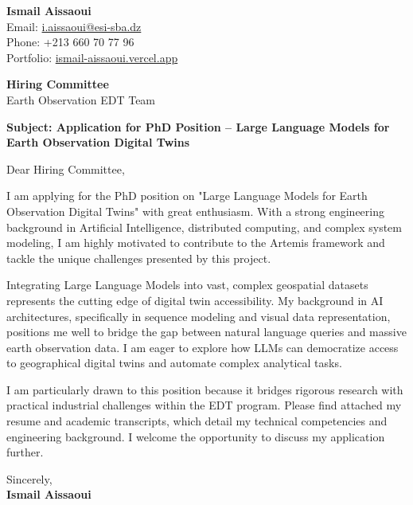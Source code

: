 \documentclass[11pt,a4paper]{article}
\begin{document}
\thispagestyle{empty}

\begin{flushright}
\textbf{Ismail Aissaoui} \\
Email: \href{mailto:i.aissaoui@esi-sba.dz}{i.aissaoui@esi-sba.dz} \\
Phone: +213 660 70 77 96 \\
Portfolio: \href{https://ismail-aissaoui.vercel.app}{ismail-aissaoui.vercel.app}
\end{flushright}

\vspace{1em}

\begin{flushleft}
\textbf{Hiring Committee} \\
Earth Observation EDT Team
\end{flushleft}

\vspace{1em}
\noindent\textbf{Subject: Application for PhD Position -- Large Language Models for Earth Observation Digital Twins}
\vspace{1em}

\noindent Dear Hiring Committee,

\vspace{1em}
\noindent
I am applying for the PhD position on "Large Language Models for Earth Observation Digital Twins" with great enthusiasm. With a strong engineering background in Artificial Intelligence, distributed computing, and complex system modeling, I am highly motivated to contribute to the Artemis framework and tackle the unique challenges presented by this project.

\vspace{0.5em}
\noindent
Integrating Large Language Models into vast, complex geospatial datasets represents the cutting edge of digital twin accessibility. My background in AI architectures, specifically in sequence modeling and visual data representation, positions me well to bridge the gap between natural language queries and massive earth observation data. I am eager to explore how LLMs can democratize access to geographical digital twins and automate complex analytical tasks.

\vspace{0.5em}
\noindent
I am particularly drawn to this position because it bridges rigorous research with practical industrial challenges within the EDT program. Please find attached my resume and academic transcripts, which detail my technical competencies and engineering background. I welcome the opportunity to discuss my application further.

\vspace{1.5em}
\noindent
Sincerely, \\[0.5em]
\textbf{Ismail Aissaoui}
\end{document}
